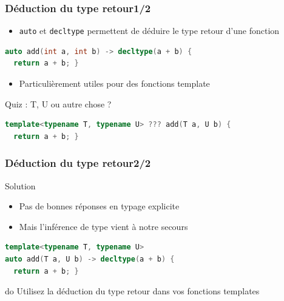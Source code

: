 \documentclass[C++.tex]{subfiles}
\begin{document}
\begin{frame}[fragile]
	\frametitle{Déduction du type retour\titlehfill{}1/2}
	\begin{itemize}
		\item \lstinline|auto| et \lstinline|decltype| permettent de déduire le type retour d'une fonction
	\end{itemize}

	\begin{lstlisting}[language=C++]
auto add(int a, int b) -> decltype(a + b) {
  return a + b; }\end{lstlisting}

	\begin{itemize}
		\item Particulièrement utiles pour des fonctions template
	\end{itemize}

	\begin{block}{Quiz : T, U ou autre chose ?}
		\begin{lstlisting}[language=C++]
template<typename T, typename U> ??? add(T a, U b) {
  return a + b; }\end{lstlisting}

	\end{block}
\end{frame}

\begin{frame}[fragile]
	\frametitle{Déduction du type retour\titlehfill{}2/2}
	\begin{block}{Solution}
		\begin{itemize}
			\item Pas de bonnes réponses en typage explicite
			\item Mais l'inférence de type vient à notre secours
		\end{itemize}
	\end{block}

	\begin{lstlisting}[language=C++]
template<typename T, typename U>
auto add(T a, U b) -> decltype(a + b) {
  return a + b; }\end{lstlisting}

	\begin{exampleblock}{do}
		Utilisez la déduction du type retour dans vos fonctions templates
	\end{exampleblock}
\end{frame}
\end{document}
